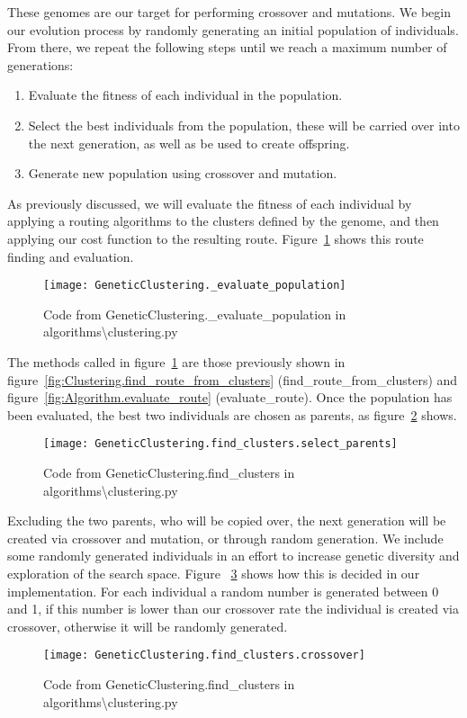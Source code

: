 \noindent
These genomes are our target for performing crossover and mutations.
We begin our evolution process by randomly generating an initial population of individuals.
From there, we repeat the following steps until we reach a maximum number of generations:
\begin{enumerate}
    \item Evaluate the fitness of each individual in the population.
    \item Select the best individuals from the population, these will be carried over into the next generation, as
    well as be used to create offspring.
    \item Generate new population using crossover and mutation.
\end{enumerate}

\noindent
As previously discussed, we will evaluate the fitness of each individual by applying a routing algorithms to the
clusters defined by the genome, and then applying our cost function to the resulting route.
Figure~\ref{fig:GeneticClustering._evaluate_population} shows this route finding and evaluation.
\begin{figure}[H]
    \centering
    \texttt{[image: GeneticClustering.\_evaluate\_population]}
    \caption{Code from GeneticClustering.\_evaluate\_population in algorithms\textbackslash clustering.py}
    \label{fig:GeneticClustering._evaluate_population}
\end{figure}

\noindent
The methods called in figure~\ref{fig:GeneticClustering._evaluate_population} are those previously shown in
figure~\ref{fig:Clustering.find_route_from_clusters} (find\_route\_from\_clusters) and
figure~\ref{fig:Algorithm.evaluate_route} (evaluate\_route).
Once the population has been evaluated, the best two individuals are chosen as parents, as figure~\ref{fig:GeneticClustering.find_clusters.select_parents}
shows.
\begin{figure}[H]
    \centering
    \texttt{[image: GeneticClustering.find\_clusters.select\_parents]}
    \caption{Code from GeneticClustering.find\_clusters in algorithms\textbackslash clustering.py}
    \label{fig:GeneticClustering.find_clusters.select_parents}
\end{figure}

\noindent
Excluding the two parents, who will be copied over, the next generation will be created via crossover and mutation,
or through random generation.
We include some randomly generated individuals in an effort to increase genetic diversity and exploration of the
search space.
Figure ~\ref{fig:GeneticClustering.find_clusters.crossover} shows how this is decided in our implementation.
For each individual a random number is generated between 0 and 1, if this number is lower than our crossover rate
the individual is created via crossover, otherwise it will be randomly generated.
\begin{figure}[H]
    \centering
    \texttt{[image: GeneticClustering.find\_clusters.crossover]}
    \caption{Code from GeneticClustering.find\_clusters in algorithms\textbackslash clustering.py}
    \label{fig:GeneticClustering.find_clusters.crossover}
\end{figure}

